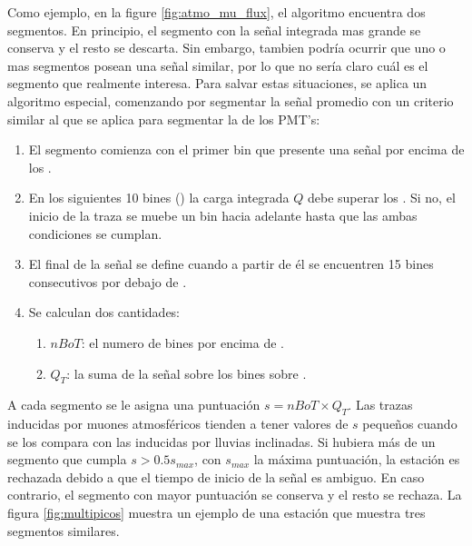 		Como ejemplo, en la figure \ref{fig:atmo_mu_flux}, el algoritmo encuentra dos segmentos.
		En principio, el segmento con la señal integrada mas grande se conserva y el resto se descarta.
		Sin embargo, tambien podría ocurrir que uno o mas segmentos posean una señal similar, por lo que no sería claro cuál es el segmento que realmente interesa.
		Para salvar estas situaciones, se aplica un algoritmo especial, comenzando por segmentar la señal promedio con un criterio similar al que se aplica para segmentar la de los PMT's:
		\begin{enumerate}
		 \item El segmento comienza con el primer bin que presente una señal por encima de los .
		 \item En los siguientes 10 bines () la carga integrada $Q$ debe superar los . Si no, el inicio de la traza se muebe un bin hacia adelante hasta que las ambas condiciones se cumplan.
		 \item El final de la señal se define cuando a partir de él se encuentren 15 bines consecutivos por debajo de .
		 \item Se calculan dos cantidades:
		 \begin{enumerate}
		  \item $nBoT$: el numero de bines por encima de .
		  \item $Q_T$: la suma de la señal sobre los bines sobre .
		 \end{enumerate}
		\end{enumerate}
		A cada segmento se le asigna una puntuación $s=nBoT\times Q_T$. 
		Las trazas inducidas por muones atmosféricos tienden a tener valores de $s$ pequeños cuando se los compara con las inducidas por lluvias inclinadas.
		Si hubiera más de un segmento que cumpla $s>0.5s_{max}$, con $s_{max}$ la máxima puntuación, la estación es rechazada debido a que el tiempo de inicio de la señal es ambiguo.
		En caso contrario, el segmento con mayor puntuación se conserva y el resto se rechaza.
		La figura \ref{fig:multipicos} muestra un ejemplo de una estación que muestra tres segmentos similares. 
